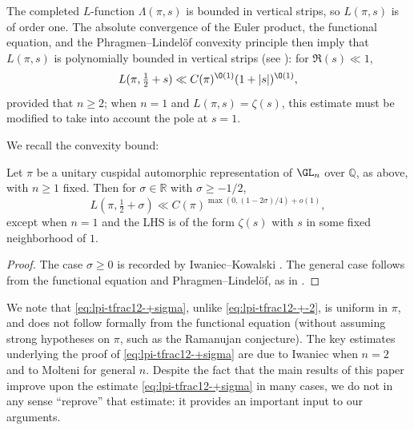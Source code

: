 The completed $L$-function $\Lambda(\pi,s)$ is bounded in vertical strips, so $L(\pi,s)$ is of order one.  The absolute convergence of the Euler product, the functional equation, and the Phragmen--Lindel\"{o}f convexity principle then imply that $L(\pi,s)$ is polynomially bounded in vertical strips (see \cite[Lemma 5.2]{MR2061214}): for $\Re(s) \ll 1$,
\begin{equation}\label{eq:lpi-tfrac12-+-2}
  L(\pi, \tfrac{1}{2} + s) \ll C(\pi)^{\O(1)} (1 + |s|)^{\O(1)},
\end{equation}
provided that $n \geq 2$; when $n = 1$ and $L(\pi,s) = \zeta(s)$, this estimate must be modified to take into account the pole at $s=1$.

We recall the convexity bound:
\begin{lemma}\label{lem:convexity-bound}
  Let $\pi$ be a unitary cuspidal automorphic representation of $\GL_n$ over $\mathbb{Q}$, as above, with $n \geq 1$ fixed.  Then for
  $\sigma \in \mathbb{R}$ with $\sigma \geq -1/2$,
  \begin{equation}\label{eq:lpi-tfrac12-+sigma}
    L(\pi, \tfrac{1}{2} +\sigma)
    \ll
    C(\pi)^{\max(0,(1 - 2 \sigma)/4) + o(1)},
  \end{equation}
  except when $n=1$ and the LHS is of the form $\zeta(s)$ with $s$ in some fixed neighborhood of $1$.
\end{lemma}
\begin{proof}
  The case $\sigma \geq 0$ is recorded by Iwaniec--Kowalski \cite[Thm 5.41]{MR2061214}.  The general case follows from the functional equation and Phragmen--Lindel\"{o}f, as in \cite[\S5, Exercise 3]{MR2061214}.
\end{proof}
\begin{remark}
  We note that \eqref{eq:lpi-tfrac12-+sigma}, unlike \eqref{eq:lpi-tfrac12-+-2}, is uniform in $\pi$, and does not follow formally from the functional equation (without assuming strong hypotheses on $\pi$, such as the Ramanujan conjecture).  The key estimates underlying the proof of \eqref{eq:lpi-tfrac12-+sigma} are due to Iwaniec \cite{MR1067982} when $n=2$ and to Molteni \cite{MR1876443} for general $n$.  Despite the fact that the main results of this paper improve upon the estimate  \eqref{eq:lpi-tfrac12-+sigma} in many cases, we do not in any sense ``reprove'' that estimate: it provides an important input to our arguments.
\end{remark}


